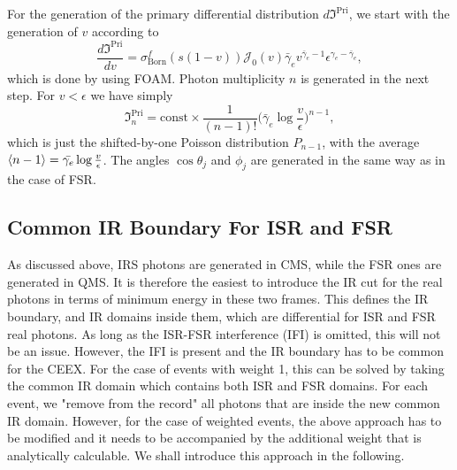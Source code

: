 For the generation of the primary differential distribution $d\mathfrak{I}^\text{Pri}$, we start with the generation of $v$ according to
\begin{equation}
\frac{d\mathfrak{I}^\text{Pri}}{dv}=\sigma^f_\text{Born}(s(1-v))\mathcal{J}_0(v)\bar{\gamma}_e
v^{\bar{\gamma}_e-1}\epsilon^{\gamma_e-\bar{\gamma}_e},
\end{equation}
which is done by using FOAM. Photon multiplicity $n$ is generated in the next step. For $v<\epsilon$ we have simply
\begin{equation}
\mathfrak{I}^\text{Pri}_n=\text{const}\times\frac{1}{(n-1)!}\biggl(\bar{\gamma}_e\log\frac{v}{\epsilon}\biggr)^{n-1},
\end{equation}
which is just the shifted-by-one Poisson distribution $P_{n-1}$, with the average $\braket{n-1}=\bar{\gamma_e}\log\frac{v}{\epsilon}$. The angles $\cos\theta_j$ and $\phi_j$ are generated in the same way as in the case of FSR.



\subsection{Common IR Boundary For ISR and FSR}

 
As discussed above, IRS photons are generated in CMS, while the FSR ones are generated in QMS. It is therefore the easiest to introduce the IR cut for the real photons in terms of minimum energy in these two frames. This defines the IR boundary, and IR domains inside them, which are differential for ISR and FSR real photons. As long as the ISR-FSR interference (IFI) is omitted, this will not be an issue. However, the IFI is present and the IR boundary has to be common for the CEEX. For the case of events with weight 1, this can be solved by taking the common IR domain which contains both ISR and FSR domains. For each event, we "remove from the record" all photons that are inside the new common IR domain. However, for the case of weighted events, the above approach has to be modified and it needs to be accompanied by the additional weight that is analytically calculable. We shall introduce this approach in the following.

